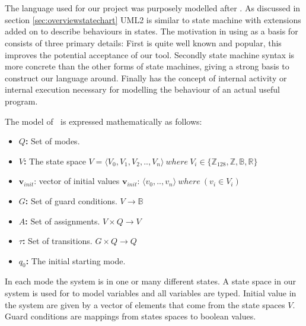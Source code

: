 \section{\plcchart}
\label{sec:statechartsem}

The language used for our project was purposely modelled after \cite{UML2}. As discussed in section \ref{sec:overviewstatechart} UML2 is similar to state machine with extensions added on to describe behaviours in states. The motivation in using \cite{UML2} as a basis for \emphasize{\plcchart} consists of three primary details: First \cite{UML2} is quite well known and popular, this improves the potential acceptance of our tool. Secondly \cite{UML2} state machine syntax is more concrete than the other forms of state machines, giving a strong basis to construct our language around. Finally \cite{UML2} has the concept of internal activity or internal execution necessary for modelling the behaviour of an actual useful program.

The model of \plcchart $\:$ is expressed mathematically as follows:

\begin{definition}
	\plcchart
	
\begin{itemize}
	\item \textbf{$Q$:} Set of modes.
	\item \textbf{$V$:} The state space $V = \langle V_0,V_1,V_2,..,V_n \rangle \: where \: V_{i}\in \lbrace \mathbb{Z}_{128}, \mathbb{Z}, \mathbb{B}, \mathbb{R} \rbrace$
	\item $\mathbf{v}_{init}$: vector of initial values $\mathbf{v}_{init}$: $\langle v_0,..,v_n \rangle \: where \: (v_i \in V_i)$
	\item \textbf{$G$:} Set of guard conditions. $V \rightarrow \mathbb{B}$
	\item \textbf{$A$:} Set of assignments. $V \times Q \rightarrow V$
	\item \textbf{$\tau$:} Set of transitions. $G \times Q \rightarrow Q$
	\item \textbf{$q_0$:} The initial starting mode.
\end{itemize}
\end{definition}

In each mode the system is in one or many different states. A state space in our system is used for to model variables and all variables are typed. Initial value in the system are given by a vector of elements that come from the state spaces $V$.  Guard conditions are mappings from states spaces to boolean values.

